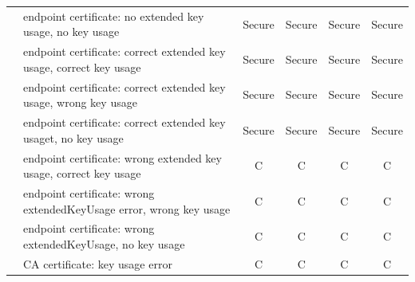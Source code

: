 \begin{table}[htbp]
\begin{tabular}{p{2.5cm}|p{8cm}|cccc}
                                                                                                    & endpoint certificate: no extended key usage, no key usage                                           & Secure               & Secure               & Secure               & Secure               \\
                                                                                                    & endpoint certificate: correct extended key usage, correct key usage                                     & Secure               & Secure               & Secure               & Secure               \\
                                                                                                    & endpoint certificate: correct extended key usage, wrong key usage                                     & Secure               & Secure               & Secure               & Secure               \\
                                                                                                    & endpoint certificate: correct extended key usaget, no key usage                                       & Secure               & Secure               & Secure               & Secure               \\
                                                                                                    & endpoint certificate: wrong extended key usage, correct key usage                                     & C                    & C                    & C                    & C                    \\
                                                                                                    & endpoint certificate: wrong extendedKeyUsage error, wrong key usage                                 & C                    & C                    & C                    & C                    \\
                                                                                                    & endpoint certificate: wrong extendedKeyUsage, no key usage                                          & C                    & C                    & C                    & C                    \\
                                                                                                    & CA certificate: key usage error                                                                     & C                    & C                    & C                    & C                    \\ \hline

\end{tabular}
\end{table}

